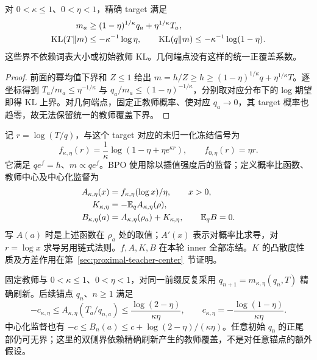 \begin{corollary}
\label{cor:power-target-coverage}
对 $0<\kappa\le1$、$0<\eta<1$，精确 target 满足
\begin{align}
 m_a&\ge(1-\eta)^{1/\kappa}q_a+\eta^{1/\kappa}T_a,\\
 \operatorname{KL}(T\Vert m)&\le-\kappa^{-1}\log\eta,\qquad
 \operatorname{KL}(q\Vert m)\le-\kappa^{-1}\log(1-\eta).
\end{align}
这些界不依赖词表大小或初始教师 KL。几何端点没有这样的统一正覆盖系数。
\end{corollary}

\begin{proof}
前面的幂均值下界和 $Z\le1$ 给出 $m=h/Z\ge h\ge(1-\eta)^{1/\kappa}q+\eta^{1/\kappa}T$。逐坐标得到 $T_a/m_a\le\eta^{-1/\kappa}$ 与 $q_a/m_a\le(1-\eta)^{-1/\kappa}$，分别取对应分布下的 log 期望即得 KL 上界。对几何端点，固定正教师概率、使对应 $q_a\to0$，其 target 概率也趋零，故无法保留统一的教师覆盖下界。
\end{proof}

记 $r=\log(T/q)$，与这个 target 对应的未归一化冻结信号为
\begin{equation}
 f_{\kappa,\eta}(r)=\frac1\kappa\log(1-\eta+\eta e^{\kappa r}),\qquad
 f_{0,\eta}(r)=\eta r.
 \label{eq:proximal-power-signal}
\end{equation}
它满足 $qe^f=h$、$m\propto qe^f$。BPO 使用除以插值强度后的监督；定义概率比函数、教师中心及中心化监督为
\begin{align}
 A_{\kappa,\eta}(x)&=f_{\kappa,\eta}(\log x)/\eta,\qquad x>0,\\
 K_{\kappa,\eta}&=-\mathbb E_q A_{\kappa,\eta}(\rho),\\
 B_{\kappa,\eta}(a)&=A_{\kappa,\eta}(\rho_a)+K_{\kappa,\eta},\qquad\mathbb E_qB=0.
 \label{eq:center-explicit-definition}
\end{align}
写 $A(a)$ 时是上述函数在 $\rho_a$ 处的取值；$A'(x)$ 表示对概率比求导，对 $r=\log x$ 求导另用链式法则。$f,A,K,B$ 在本轮 inner 全部冻结。$K$ 的凸散度性质及方差作用在第~\ref{sec:proximal-teacher-center}~节证明。

\begin{corollary}[精确刷新后的双侧监督范围]
\label{cor:power-refreshed-signal-range}
固定教师与 $0<\kappa\le1$、$0<\eta<1$，对同一前缀反复采用 $q_{n+1}=m_{\kappa,\eta}(q_n,T)$ 精确刷新。后续锚点 $q_n$、$n\ge1$ 满足
\begin{equation}
 -c_{\kappa,\eta}\le A_{\kappa,\eta}(T_a/q_{n,a})
 \le\frac{\log(2-\eta)}{\kappa\eta},\qquad
 c_{\kappa,\eta}=-\frac{\log(1-\eta)}{\kappa\eta}.
\end{equation}
中心化监督也有 $-c\le B_n(a)\le c+\log(2-\eta)/(\kappa\eta)$。任意初始 $q_0$ 的正尾部仍可无界；这里的双侧界依赖精确刷新产生的教师覆盖，不是对任意锚点的额外假设。
\end{corollary}


